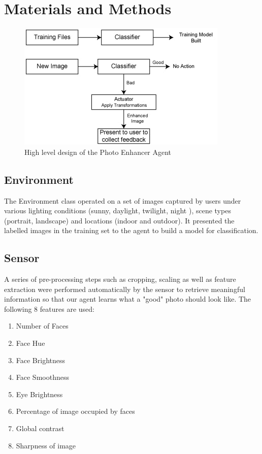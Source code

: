\documentclass[11pt, a4paper]{article}
\begin{document}
\section{Materials and Methods}
\begin{figure}[!h]
\centering
\caption{High level design of the Photo Enhancer Agent}
\includegraphics[scale=0.7]{Agent}
\end{figure}

\subsection{Environment}
The Environment class operated on a set of images captured by users under various lighting conditions (sunny, daylight, twilight, night ), scene types (portrait, landscape) and locations (indoor and outdoor). 
It presented the labelled images in the training set to the agent to build a model for classification.

\subsection{Sensor} 
A series of pre-processing steps such as cropping, scaling as well as feature extraction were performed automatically by the sensor to retrieve meaningful information so that our agent learns what a "good" photo should look like. The following 8 features are used:
\begin{enumerate}
  \item Number of Faces
  \item Face Hue
  \item Face Brightness
  \item Face Smoothness
  \item Eye Brightness
  \item Percentage of image occupied by faces
  \item Global contrast
  \item Sharpness of image
\end{enumerate}
\end{document}
